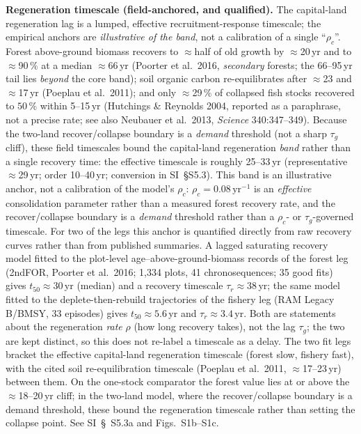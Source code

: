 \documentclass[11pt]{article}
\begin{document}
\noindent\textbf{Regeneration timescale (field-anchored, and qualified).} The capital-land regeneration lag is a lumped, effective recruitment-response timescale; the empirical anchors are \emph{illustrative of the band}, not a calibration of a single ``$\rho_c$''. Forest above-ground biomass recovers to $\approx$half of old growth by $\approx$20\,yr and to $\approx$90\,\% at a median $\approx$66\,yr (Poorter et al.\ 2016, \emph{secondary} forests; the 66--95\,yr tail lies \emph{beyond} the core band); soil organic carbon re-equilibrates after $\approx$23 and $\approx$17\,yr (Poeplau et al.\ 2011); and only $\approx$29\,\% of collapsed fish stocks recovered to $50\,\%$ within 5--15\,yr (Hutchings \& Reynolds 2004, reported as a paraphrase, not a precise rate; see also Neubauer et al.\ 2013, \emph{Science} 340:347--349). Because the two-land recover/collapse boundary is a \emph{demand} threshold (not a sharp $\tau_g$ cliff), these field timescales bound the capital-land regeneration \emph{band} rather than a single recovery time: the effective timescale is roughly 25--33\,yr (representative $\approx$29\,yr; order 10--40\,yr; conversion in SI~\S S5.3). This band is an illustrative anchor, not a calibration of the model's $\rho_c$: $\rho_c=0.08\,\text{yr}^{-1}$ is an \emph{effective} consolidation parameter rather than a measured forest recovery rate, and the recover/collapse boundary is a \emph{demand} threshold rather than a $\rho_c$- or $\tau_g$-governed timescale. For two of the legs this anchor is quantified directly from raw recovery curves rather than from published summaries. A lagged saturating recovery model fitted to the plot-level age--above-ground-biomass records of the forest leg (2ndFOR, Poorter et al.\ 2016; 1{,}334 plots, 41 chronosequences; 35 good fits) gives $t_{50}\approx30$\,yr (median) and a recovery timescale $\tau_r\approx38$\,yr; the same model fitted to the deplete-then-rebuild trajectories of the fishery leg (RAM Legacy B/BMSY, 33 episodes) gives $t_{50}\approx5.6$\,yr and $\tau_r\approx3.4$\,yr. Both are statements about the regeneration \emph{rate} $\rho$ (how long recovery takes), not the lag $\tau_g$; the two are kept distinct, so this does not re-label a timescale as a delay. The two fit legs bracket the effective capital-land regeneration timescale (forest slow, fishery fast), with the cited soil re-equilibration timescale (Poeplau et al.\ 2011, $\approx$17--23\,yr) between them. On the one-stock comparator the forest value lies at or above the $\approx$18--20\,yr cliff; in the two-land model, where the recover/collapse boundary is a demand threshold, these bound the regeneration timescale rather than setting the collapse point. See SI~\S\ S5.3a and Figs.~S1b--S1c.
\end{document}
